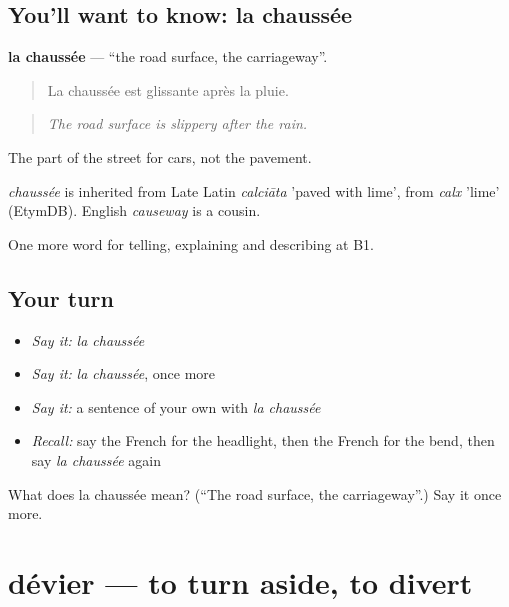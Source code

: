 \subsection*{You'll want to know: la chaussée}
\textbf{la chaussée} — \textquotedblleft{}the road surface, the carriageway\textquotedblright{}.

\begin{quote}
La chaussée est glissante après la pluie.
\end{quote}

\begin{quote}
\emph{The road surface is slippery after the rain.}
\end{quote}

The part of the street for cars, not the pavement.

\begin{cousinweb}
\emph{chaussée} is inherited from Late Latin \emph{calciāta} 'paved with lime', from \emph{calx} 'lime' (EtymDB). English \emph{causeway} is a cousin.
\end{cousinweb}

\begin{grammarlens}[title={What you've built}]
One more word for telling, explaining and describing at B1.
\end{grammarlens}

\subsection*{Your turn}
\begin{itemize}
\raggedright
  \item \emph{Say it:} \emph{la chaussée}
  \item \emph{Say it:} \emph{la chaussée}, once more
  \item \emph{Say it:} a sentence of your own with \emph{la chaussée}
  \item \emph{Recall:} say the French for the headlight, then the French for the bend, then say \emph{la chaussée} again
\end{itemize}

\begin{tcolorbox}[breakable,colback=teal!4,colframe=teal!35!black,title={Before you move on}]
What does la chaussée mean? (\textquotedblleft{}The road surface, the carriageway\textquotedblright{}.) Say it once more.
\end{tcolorbox}
\section[dévier]{dévier — to turn aside, to divert}

